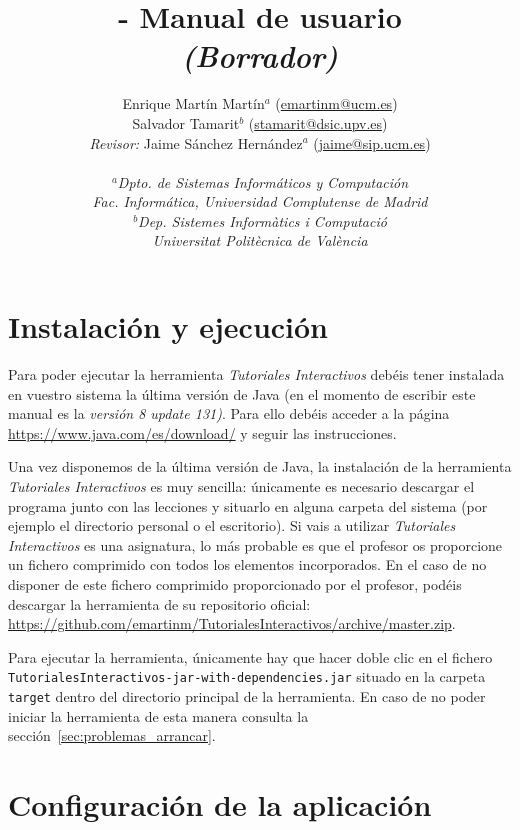 \documentclass[]{article}
\title{\toolname{} - Manual de usuario \\ \emph{(Borrador)}}
\author{Enrique Martín Martín$^a$ (\url{emartinm@ucm.es}) \\ 
	Salvador Tamarit$^b$ (\url{stamarit@dsic.upv.es}) \\
	\emph{Revisor:} Jaime Sánchez Hernández$^a$ (\url{jaime@sip.ucm.es}) \\~\\[-.4cm]
	\normalsize{\emph{$^a$Dpto. de Sistemas Informáticos y Computación}}\\[-0.1cm]
	\normalsize{\emph{Fac. Informática, Universidad Complutense de Madrid}}\\[-0.1cm]
	\normalsize{\emph{$^b$Dep. Sistemes Informàtics i Computació}}\\[-0.1cm]
	\normalsize{\emph{Universitat Politècnica de València}}\\[-0.1cm]
}
\newcommand{\toolname}{\emph{Tutoriales Interactivos}}
\begin{document}
\maketitle

\tableofcontents

\clearpage

\section{Instalación y ejecución}

Para poder ejecutar la herramienta \toolname{} debéis tener instalada en vuestro sistema la última versión de Java (en el momento de escribir este manual es la \emph{versión 8 update 131)}. Para ello debéis acceder a la página \url{https://www.java.com/es/download/} y seguir las instrucciones.

Una vez disponemos de la última versión de Java, la instalación de la herramienta \toolname{} es muy sencilla: únicamente es necesario descargar el programa junto con las lecciones y situarlo en alguna carpeta del sistema (por ejemplo el directorio personal o el escritorio). Si vais a utilizar \toolname{} es una asignatura, lo más probable es que el profesor os proporcione un fichero comprimido con todos los elementos incorporados. En el caso de no disponer de este fichero comprimido proporcionado por el profesor, podéis descargar la herramienta de su repositorio oficial: \url{https://github.com/emartinm/TutorialesInteractivos/archive/master.zip}.

Para ejecutar la herramienta, únicamente hay que hacer doble clic en el fichero \texttt{TutorialesInteractivos-jar-with-dependencies.jar} situado en la carpeta \texttt{target} dentro del directorio principal de la herramienta. En caso de no poder iniciar la herramienta de esta manera consulta la sección~\ref{sec:problemas_arrancar}.

\section{Configuración de la aplicación}
\end{document}
